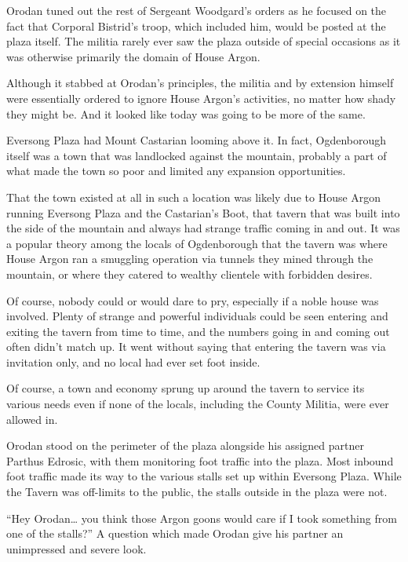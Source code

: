 \documentclass[a4paper,10pt]{book}
\begin{document}
Orodan tuned out the rest of Sergeant Woodgard’s orders as he focused on the fact that Corporal Bistrid’s troop, which included him, would be posted at the plaza itself. The militia rarely ever saw the plaza outside of special occasions as it was otherwise primarily the domain of House Argon.\par
Although it stabbed at Orodan’s principles, the militia and by extension himself were essentially ordered to ignore House Argon’s activities, no matter how shady they might be. And it looked like today was going to be more of the same.\par
\par
Eversong Plaza had Mount Castarian looming above it. In fact, Ogdenborough itself was a town that was landlocked against the mountain, probably a part of what made the town so poor and limited any expansion opportunities.\par
That the town existed at all in such a location was likely due to House Argon running Eversong Plaza and the Castarian’s Boot, that tavern that was built into the side of the mountain and always had strange traffic coming in and out. It was a popular theory among the locals of Ogdenborough that the tavern was where House Argon ran a smuggling operation via tunnels they mined through the mountain, or where they catered to wealthy clientele with forbidden desires.\par
Of course, nobody could or would dare to pry, especially if a noble house was involved. Plenty of strange and powerful individuals could be seen entering and exiting the tavern from time to time, and the numbers going in and coming out often didn’t match up. It went without saying that entering the tavern was via invitation only, and no local had ever set foot inside.\par
Of course, a town and economy sprung up around the tavern to service its various needs even if none of the locals, including the County Militia, were ever allowed in.\par
Orodan stood on the perimeter of the plaza alongside his assigned partner Parthus Edrosic, with them monitoring foot traffic into the plaza. Most inbound foot traffic made its way to the various stalls set up within Eversong Plaza. While the Tavern was off-limits to the public, the stalls outside in the plaza were not.\par
“Hey Orodan… you think those Argon goons would care if I took something from one of the stalls?” A question which made Orodan give his partner an unimpressed and severe look.\par
\end{document}
